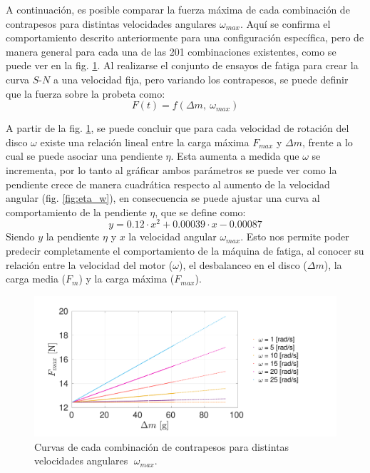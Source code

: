 A continuación, es posible comparar la fuerza máxima de cada combinación de contrapesos para distintas velocidades angulares $\omega_{max}$. Aquí se confirma el comportamiento descrito anteriormente para una configuración específica, pero de manera general para cada una de las 201 combinaciones existentes, como se puede ver en la fig. \ref{fig:fmax_dm}. Al realizarse el conjunto de ensayos de fatiga para crear la curva $S$-$N$ a una velocidad fija, pero variando los contrapesos, se puede definir que la fuerza sobre la probeta como:
\begin{equation}\label{eq:func_psiomega}
	F(t) = f(\Delta m,\: \omega_{max})
\end{equation}

A partir de la fig. \ref{fig:fmax_dm}, se puede concluir que para cada velocidad de rotación del disco $\omega$ existe una relación lineal entre la carga máxima $F_{max}$ y $\Delta m$, frente a lo cual se puede asociar una pendiente $\eta$. Esta aumenta a medida que $\omega$ se incrementa, por lo tanto al gráficar ambos parámetros se puede ver como la pendiente crece de manera cuadrática respecto al aumento de la velocidad angular (fig. \ref{fig:eta_w}), en consecuencia se puede ajustar una curva al comportamiento de la pendiente $\eta$, que se define como:
\begin{equation}
	y = 0.12\cdot x^2 + 0.00039\cdot x - 0.00087
\end{equation}
Siendo $y$ la pendiente $\eta$ y $x$ la velocidad angular $\omega_{max}$. Esto nos permite poder predecir completamente el comportamiento de la máquina de fatiga, al conocer su relación entre la velocidad del motor ($\omega$), el desbalanceo en el disco ($\Delta m$), la carga media ($F_m$) y la carga máxima ($F_{max}$).

\begin{figure}
\centering
\includegraphics[width=1\linewidth, trim={1cm 0cm 4cm 1cm}, clip]{Imagenes/fmax_dm2.pdf}
\caption{Curvas de cada combinación de contrapesos para distintas velocidades angulares $\; \omega_{max}$.}
\label{fig:fmax_dm}
\end{figure}


